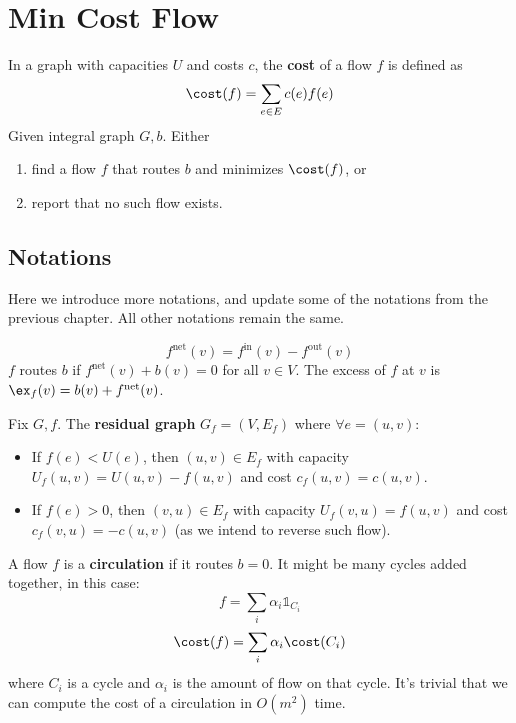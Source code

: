 \chapter{Min Cost Flow}

\begin{problem}
	In a graph with capacities $U$ and costs $c$, the \textbf{cost} of a flow $f$ is defined as
	\[ \cost(f) = \sum_{e \in E} c(e) f(e) \]
	Given integral graph $G, b$. Either
	\begin{enumerate}
		\item find a flow $f$ that routes $b$ and minimizes $\cost(f)$, or
		\item report that no such flow exists.
	\end{enumerate}
\end{problem}

\section{Notations}

Here we introduce more notations, and update some of the notations from the previous chapter. All other notations remain the same.

\begin{definition}
  \[ f^{\text{net}}(v) = f^{\text{in}}(v) - f^{\text{out}}(v) \]
  $f$ routes $b$ if $f^{\text{net}}(v) + b(v) = 0$ for all $v \in V$.
  The excess of $f$ at $v$ is $\ex_f(v) = b(v) + f^{\text{net}}(v)$.
\end{definition}

\begin{definition}
	Fix $G,f$. The \textbf{residual graph} $G_f = (V,E_f)$ where $\forall e = (u,v)$:
	\begin{itemize}
		\item If $f(e) < U(e)$, then $(u,v) \in E_f$ with capacity $U_f(u,v) = U(u,v) - f(u,v)$ and cost $c_f(u,v) = c(u,v)$.
		\item If $f(e) > 0$, then $(v,u) \in E_f$ with capacity $U_f(v,u) = f(u,v)$ and cost $c_f(v,u) = -c(u,v)$ (as we intend to reverse such flow).
	\end{itemize}
\end{definition}

\begin{definition}[Circulation]
	A flow $f$ is a \textbf{circulation} if it routes $b = 0$.
	It might be many cycles added together, in this case:
	\[ f = \sum_i \alpha_i \mathbb{1}_{C_i} \]
	\[ \cost(f) = \sum_i \alpha_i \cost(C_i) \]
	where $C_i$ is a cycle and $\alpha_i$ is the amount of flow on that cycle.
	It's trivial that we can compute the cost of a circulation in $O(m^2)$ time.
\end{definition}


